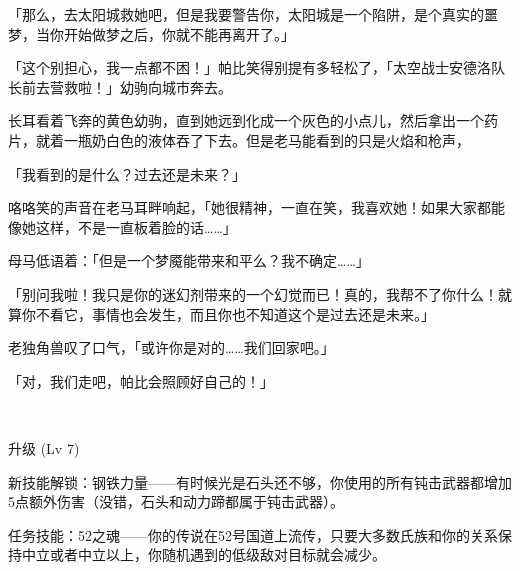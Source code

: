 「那么，去太阳城救她吧，但是我要警告你，太阳城是一个陷阱，是个真实的噩梦，当你开始做梦之后，你就不能再离开了。」

「这个别担心，我一点都不困！」帕比笑得别提有多轻松了，「太空战士安德洛队长前去营救啦！」幼驹向城市奔去。

长耳看着飞奔的黄色幼驹，直到她远到化成一个灰色的小点儿，然后拿出一个药片，就着一瓶奶白色的液体吞了下去。但是老马能看到的只是火焰和枪声，

「我看到的是什么？过去还是未来？」

咯咯笑的声音在老马耳畔响起，「她很精神，一直在笑，我喜欢她！如果大家都能像她这样，不是一直板着脸的话……」

母马低语着：「但是一个梦魇能带来和平么？我不确定……」

「别问我啦！我只是你的迷幻剂带来的一个幻觉而已！真的，我帮不了你什么！就算你不看它，事情也会发生，而且你也不知道这个是过去还是未来。」

老独角兽叹了口气，「或许你是对的……我们回家吧。」

「对，我们走吧，帕比会照顾好自己的！」

~\vfill

\begin{note}
升级 (Lv 7)

新技能解锁：钢铁力量——有时候光是石头还不够，你使用的所有钝击武器都增加5点额外伤害（没错，石头和动力蹄都属于钝击武器）。

任务技能：52之魂——你的传说在52号国道上流传，只要大多数氏族和你的关系保持中立或者中立以上，你随机遇到的低级敌对目标就会减少。
\end{note}

